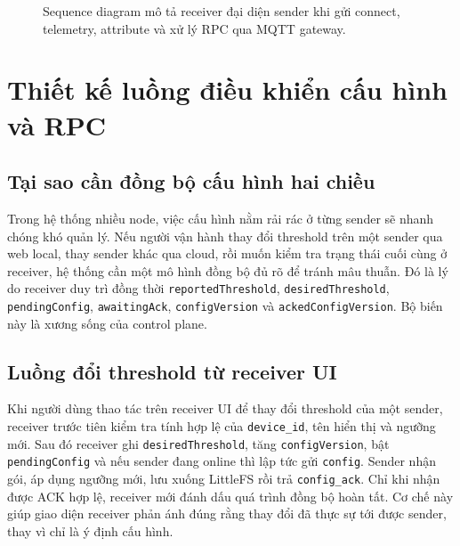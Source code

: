 \documentclass[12pt,a4paper]{report}
\begin{document}
\begin{figure}[H]
\centering
{}
\caption{Sequence diagram mô tả receiver đại diện sender khi gửi connect, telemetry, attribute và xử lý RPC qua MQTT gateway.}
\label{fig:mqtt-seq}
\end{figure}

\section{Thiết kế luồng điều khiển cấu hình và RPC}

\subsection{Tại sao cần đồng bộ cấu hình hai chiều}
Trong hệ thống nhiều node, việc cấu hình nằm rải rác ở từng sender sẽ nhanh chóng khó quản lý. Nếu người vận hành thay đổi threshold trên một sender qua web local, thay sender khác qua cloud, rồi muốn kiểm tra trạng thái cuối cùng ở receiver, hệ thống cần một mô hình đồng bộ đủ rõ để tránh mâu thuẫn. Đó là lý do receiver duy trì đồng thời \texttt{reportedThreshold}, \texttt{desiredThreshold}, \texttt{pendingConfig}, \texttt{awaitingAck}, \texttt{configVersion} và \texttt{ackedConfigVersion}. Bộ biến này là xương sống của control plane.

\subsection{Luồng đổi threshold từ receiver UI}
Khi người dùng thao tác trên receiver UI để thay đổi threshold của một sender, receiver trước tiên kiểm tra tính hợp lệ của \texttt{device\_id}, tên hiển thị và ngưỡng mới. Sau đó receiver ghi \texttt{desiredThreshold}, tăng \texttt{configVersion}, bật \texttt{pendingConfig} và nếu sender đang online thì lập tức gửi \texttt{config}. Sender nhận gói, áp dụng ngưỡng mới, lưu xuống LittleFS rồi trả \texttt{config\_ack}. Chỉ khi nhận được ACK hợp lệ, receiver mới đánh dấu quá trình đồng bộ hoàn tất. Cơ chế này giúp giao diện receiver phản ánh đúng rằng thay đổi đã thực sự tới được sender, thay vì chỉ là ý định cấu hình.
\end{document}
